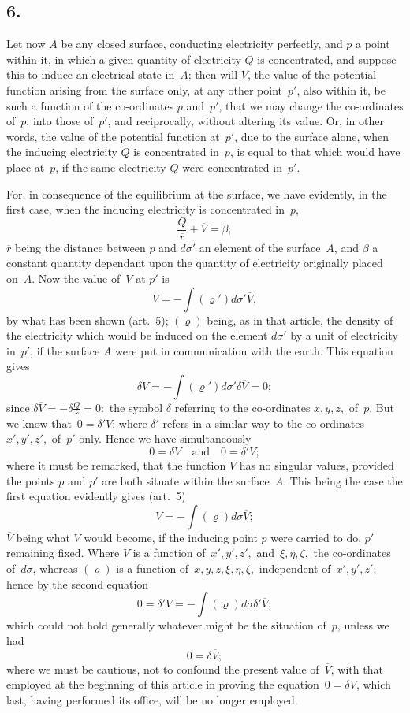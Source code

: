\documentclass[11pt,notitlepage]{amsart}
\newcommand\Section[1]{\subsection{{#1}}}
\renewcommand{\rho}{\varrho}
\begin{document}
\Section{6.}
Let now $A$ be any closed surface, conducting electricity perfectly,
and $p$ a point within it, in which a given quantity of
electricity $Q$ is concentrated,
and suppose this to induce an electrical state in~$A$; then will $V$,
the value of the potential function arising from the surface only, at any other
point~$p'$, also within it,
be such a function of the co-ordinates $p$ and~$p'$, that
we may change the co-ordinates of~$p$,
into those of~$p'$, and reciprocally, without
altering its value. Or, in other words,
the value of the potential function at~$p'$,
due to the surface alone,
when the inducing electricity $Q$ is concentrated in~$p$,
is equal to that which would have place at~$p$,
if the same electricity $Q$ were
concentrated in~$p'$.

For, in consequence of the equilibrium at the surface, we have evidently,
in the first case, when the inducing electricity is concentrated in~$p$,
\[
\frac{Q}{\overline{r}}+\overline{V}=\beta;
\]
$\overline{r}$ being the distance between $p$ and $d\sigma'$
an element of the surface~$A$, and $\beta$
a constant quantity dependant upon the quantity of electricity originally placed
on~$A$. Now the value of~$V$ at $p'$ is
\[
V=-\int(\rho')d\sigma'\overline{V},
\]
by what has been shown (art.~5);
$(\rho)$ being, as in that article, the density
of the electricity which would be induced
on the element $d\sigma'$ by a unit of
electricity in~$p'$, if the surface $A$
were put in communication with the earth.
This equation gives
\[
\delta V=-\int(\rho')d\sigma'\delta\overline{V}=0;
\]
since $\delta\overline{V}=-\delta\frac{Q}{\overline{r}}=0:$
the symbol $\delta$ referring to the co-ordinates $x,y,z,$
of~$p$. But we know that~$0=\delta'V$;
where $\delta'$ refers in a similar way to the
co-ordinates $x',y',z',$ of~$p'$ only. Hence we have simultaneously
\[
0=\delta V \quad\text{and}\quad 0=\delta'V;
\]
where it must be remarked,
that the function $V$ has no singular values, provided
the points $p$ and $p'$ are both situate within the surface~$A$. This being
the case the first equation evidently gives (art.~5)
\[
V=-\int(\rho)d\sigma\overline{V};
\]
$\overline{V}$ being what $V$ would become,
if the inducing point $p$ were carried to do,
$p'$ remaining fixed. Where $\overline{V}$ is
a function of~$x',y',z',$ and~$\xi,\eta,\zeta,$ the
co-ordinates of~$d\sigma$, whereas $(\rho)$
is a function of~$x,y,z,\xi,\eta,\zeta,$ independent
of~$x',y',z'$; hence by the second equation
\[
0=\delta'V=-\int(\rho)d\sigma\delta'\overline{V},
\]
which could not hold generally whatever might be the situation of~$p$, unless
we had
\[
0=\delta\overline{V};
\]
where we must be cautious, not to confound the present value
of~$\overline{V}$, with
that employed at the beginning of this article in proving
the equation~${0=\delta V}$,
which last, having performed its office, will be no longer employed.
\end{document}

